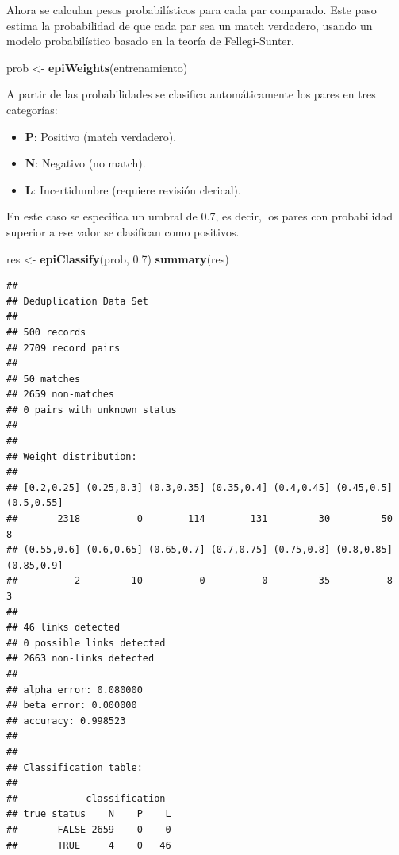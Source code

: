 \documentclass[
  12pt,
]{book}
\newenvironment{Shaded}{\begin{snugshade}}{\end{snugshade}}
\newcommand{\FloatTok}[1]{\textcolor[rgb]{0.00,0.00,0.81}{#1}}
\newcommand{\FunctionTok}[1]{\textcolor[rgb]{0.13,0.29,0.53}{\textbf{#1}}}
\newcommand{\NormalTok}[1]{#1}
\newcommand{\OtherTok}[1]{\textcolor[rgb]{0.56,0.35,0.01}{#1}}
\providecommand{\tightlist}{%
  \setlength{\itemsep}{0pt}\setlength{\parskip}{0pt}}
\begin{document}
Ahora se calculan pesos probabilísticos para cada par comparado. Este paso estima la probabilidad de que cada par sea un match verdadero, usando un modelo probabilístico basado en la teoría de Fellegi-Sunter.

\begin{Shaded}
\begin{Highlighting}[]
\NormalTok{prob }\OtherTok{\textless{}{-}} \FunctionTok{epiWeights}\NormalTok{(entrenamiento)}
\end{Highlighting}
\end{Shaded}

A partir de las probabilidades se clasifica automáticamente los pares en tres categorías:

\begin{itemize}
\tightlist
\item
  \textbf{P}: Positivo (match verdadero).
\item
  \textbf{N}: Negativo (no match).
\item
  \textbf{L}: Incertidumbre (requiere revisión clerical).
\end{itemize}

En este caso se especifica un umbral de 0.7, es decir, los pares con probabilidad superior a ese valor se clasifican como positivos.

\begin{Shaded}
\begin{Highlighting}[]
\NormalTok{res }\OtherTok{\textless{}{-}} \FunctionTok{epiClassify}\NormalTok{(prob, }\FloatTok{0.7}\NormalTok{)}
\FunctionTok{summary}\NormalTok{(res)}
\end{Highlighting}
\end{Shaded}

\begin{verbatim}
## 
## Deduplication Data Set
## 
## 500 records 
## 2709 record pairs 
## 
## 50 matches
## 2659 non-matches
## 0 pairs with unknown status
## 
## 
## Weight distribution:
## 
## [0.2,0.25] (0.25,0.3] (0.3,0.35] (0.35,0.4] (0.4,0.45] (0.45,0.5] (0.5,0.55] 
##       2318          0        114        131         30         50          8 
## (0.55,0.6] (0.6,0.65] (0.65,0.7] (0.7,0.75] (0.75,0.8] (0.8,0.85] (0.85,0.9] 
##          2         10          0          0         35          8          3 
## 
## 46 links detected 
## 0 possible links detected 
## 2663 non-links detected 
## 
## alpha error: 0.080000
## beta error: 0.000000
## accuracy: 0.998523
## 
## 
## Classification table:
## 
##            classification
## true status    N    P    L
##       FALSE 2659    0    0
##       TRUE     4    0   46
\end{verbatim}
\end{document}
